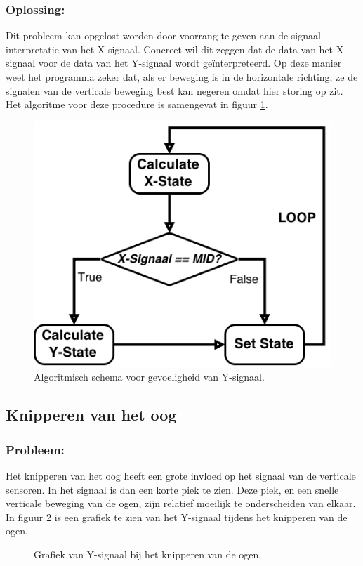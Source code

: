\documentclass{article}
\newcommand{\figwidth}{0.85\linewidth}
\begin{document}
\subsubsection{Oplossing:}
Dit probleem kan opgelost worden door voorrang te geven aan de signaal-interpretatie van het X-signaal. Concreet wil dit zeggen dat de data van het X-signaal voor de data van het Y-signaal wordt ge\"interpreteerd. Op deze manier weet het programma zeker dat, als er beweging is in de horizontale richting, ze de signalen van de verticale beweging best kan negeren omdat hier storing op zit. Het algoritme voor deze procedure is samengevat in figuur \ref{fig:algogevoeligheidY}.

\begin{figure}[H]
	\centering
	\includegraphics[width=0.7\linewidth]{images/GevoeligheidY}
	\caption{Algoritmisch schema voor gevoeligheid van Y-signaal.}
	\label{fig:algogevoeligheidY}
\end{figure}

\subsection{Knipperen van het oog}

\subsubsection{Probleem:}
Het knipperen van het oog heeft een grote invloed op het signaal van de verticale sensoren. In het signaal is dan een korte piek te zien. Deze piek, en een snelle verticale beweging van de ogen, zijn relatief moeilijk te onderscheiden van elkaar. In figuur \ref{fig:blinksnotfiltered} is een grafiek te zien van het Y-signaal tijdens het knipperen van de ogen.

\begin{figure}[H]
	\centering
	\caption{Grafiek van Y-signaal bij het knipperen van de ogen.}
	\label{fig:blinksnotfiltered}
\end{figure}
\end{document}
